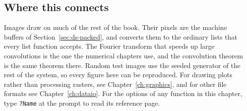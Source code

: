 \subsection*{Where this connects}

Images draw on much of the rest of the book. Their pixels are the machine buffers
of Section~\ref{sec:ds-packed}, and  converts them to the ordinary
lists that every list function accepts. The Fourier transform that speeds up large
convolutions is the one the numerical chapters use, and the convolution theorem is
the same theorem there. Random test images use the seeded generator of the rest of
the system, so every figure here can be reproduced. For drawing plots rather than
processing rasters, see Chapter~\ref{ch:graphics}, and for other file formats see
Chapter~\ref{ch:dataio}. For the options of any function in this chapter, type
\texttt{?Name} at the prompt to read its reference page.

